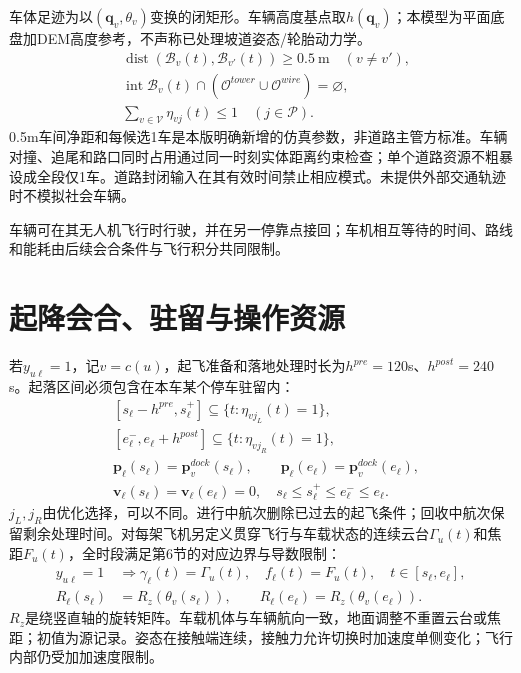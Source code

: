 \noindent 车体足迹为以$(\mathbf q_v,\theta_v)$变换的闭矩形。车辆高度基点取$h(\mathbf q_v)$；本模型为平面底盘加DEM高度参考，不声称已处理坡道姿态/轮胎动力学。
\begin{align}
 &\operatorname{dist}(\mathcal B_v(t),\mathcal B_{v'}(t))\ge0.5\ \mathrm m
                  \quad(v\ne v'),\label{eng:eq:groundcollision}\\
 &\operatorname{int}\mathcal B_v(t)\cap
     (\mathcal O^{tower}\cup\mathcal O^{wire})=\varnothing,\label{eng:eq:groundobstacle}\\
 &\sum_{v\in\mathcal V}\eta_{vj}(t)\le1\quad(j\in\mathcal P).
 \label{eng:eq:parkingcapacity}
\end{align}
\noindent 0.5m车间净距和每候选1车是本版明确新增的仿真参数，非道路主管方标准。车辆对撞、追尾和路口同时占用通过同一时刻实体距离约束检查；单个道路资源不粗暴设成全段仅1车。道路封闭输入在其有效时间禁止相应模式。未提供外部交通轨迹时不模拟社会车辆。

\noindent 车辆可在其无人机飞行时行驶，并在另一停靠点接回；车机相互等待的时间、路线和能耗由后续会合条件与飞行积分共同限制。
\clearpage

\section{起降会合、驻留与操作资源}
\noindent 若$y_{u\ell}=1$，记$v=c(u)$，起飞准备和落地处理时长为$h^{pre}=120$s、$h^{post}=240$s。起落区间必须包含在本车某个停车驻留内：
\begin{align}
 &[s_\ell-h^{pre},s_\ell^+]\subseteq\{t:\eta_{vj_L}(t)=1\},\\
 &[e_\ell^-,e_\ell+h^{post}]\subseteq\{t:\eta_{vj_R}(t)=1\},\\
 &\mathbf p_\ell(s_\ell)=\mathbf p_v^{dock}(s_\ell),\qquad
 \mathbf p_\ell(e_\ell)=\mathbf p_v^{dock}(e_\ell),\\
 &\mathbf v_\ell(s_\ell)=\mathbf v_\ell(e_\ell)=0,\quad
 s_\ell\le s_\ell^+\le e_\ell^-\le e_\ell.
 \label{eng:eq:rendezvous}
\end{align}
\noindent $j_L,j_R$由优化选择，可以不同。进行中航次删除已过去的起飞条件；回收中航次保留剩余处理时间。对每架飞机另定义贯穿飞行与车载状态的连续云台$\Gamma_u(t)$和焦距$F_u(t)$，全时段满足第6节的对应边界与导数限制：
\begin{align}
 y_{u\ell}=1&\Rightarrow \gamma_\ell(t)=\Gamma_u(t),\quad f_\ell(t)=F_u(t),\quad t\in[s_\ell,e_\ell],\\
 R_\ell(s_\ell)&=R_z(\theta_v(s_\ell)),\qquad R_\ell(e_\ell)=R_z(\theta_v(e_\ell)).
 \label{eng:eq:aircraftcontinuity}
\end{align}
\noindent $R_z$是绕竖直轴的旋转矩阵。车载机体与车辆航向一致，地面调整不重置云台或焦距；初值为源记录。姿态在接触端连续，接触力允许切换时加速度单侧变化；飞行内部仍受加加速度限制。


